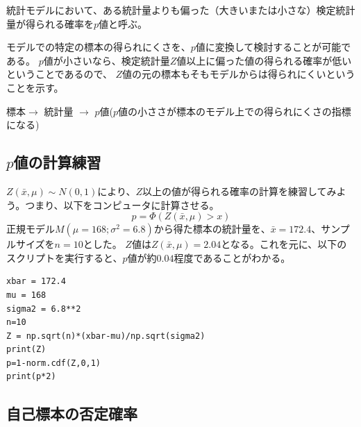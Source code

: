 \begin{defi}
    統計モデルにおいて、ある統計量よりも偏った（大きいまたは小さな）検定統計量が得られる確率を$p$値と呼ぶ。
\end{defi}

モデルでの特定の標本の得られにくさを、$p$値に変換して検討することが可能である。
$p$値が小さいなら、検定統計量$Z$値以上に偏った値の得られる確率が低いということであるので、
$Z$値の元の標本もそもモデルからは得られにくいということを示す。

\begin{center}
    標本$\rightarrow$ 統計量 $\rightarrow$ $p$値($p$値の小ささが標本のモデル上での得られにくさの指標になる)
\end{center}
\fi




\subsection{$p$値の計算練習}
$Z(\bar{x},\mu)\sim N(0,1)$により、$Z$以上の値が得られる確率の計算を練習してみよう。つまり、以下をコンピュータに計算させる。
\begin{equation*}
    p = \varPhi(Z(\bar{x},\mu)>x)
\end{equation*}
正規モデル$M(\mu=168;\sigma^2=6.8)$から得た標本の統計量を、$\bar{x}=172.4$、サンプルサイズを$n=10$とした。
$Z$値は$Z(\bar{x},\mu)=2.04$となる。これを元に、以下のスクリプトを実行すると、$p$値が約$0.04$程度であることがわかる。

\begin{lstlisting}
xbar = 172.4
mu = 168
sigma2 = 6.8**2
n=10
Z = np.sqrt(n)*(xbar-mu)/np.sqrt(sigma2)
print(Z)
p=1-norm.cdf(Z,0,1)
print(p*2)
\end{lstlisting}



\subsection{自己標本の否定確率}

